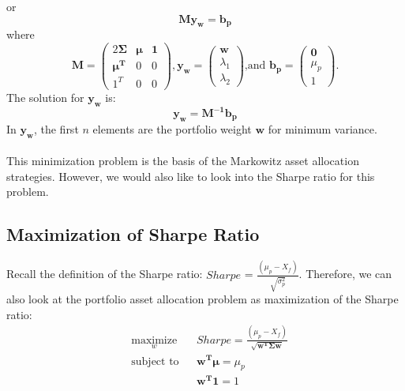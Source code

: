 \documentclass[12pt,titlepage,letter]{article}
\begin{document}
			or 
			$$
				\mathbf{My_w} = \mathbf{b_p}
			$$
			where
			\begin{equation*}
				\mathbf{M} = \begin{pmatrix} 
					2\mathbf{\Sigma} & \pmb{\mu} & \mathbf{1} \\ 
					\mathbf{\mu^T} & 0 & 0 \\ 
					1^T & 0 & 0 
				\end{pmatrix}, 
				\mathbf{y_w}=\begin{pmatrix}
					\mathbf{w} \\ \lambda_1 \\ \lambda_2
				\end{pmatrix} 
				\text{,and }
				\mathbf{b_p} = \begin{pmatrix}
					\mathbf{0} \\ \mu_p \\ 1
				\end{pmatrix}.
			\end{equation*}
			The solution for $\mathbf{y_w}$ is: 
			\begin{equation}
				\mathbf{y_w} = \mathbf{M^{-1}b_p}
			\end{equation}
			In $\mathbf{y_w}$, the first $n$ elements are the portfolio weight $\mathbf{w}$ for minimum variance. \\ \\

			This minimization problem is the basis of the Markowitz asset allocation strategies. However, we would also like to look into the Sharpe ratio for this problem. \\

	\subsection{Maximization of Sharpe Ratio}
		Recall the definition of the Sharpe ratio: $Sharpe$ = $\frac{(\mu_p - X_f)}{\sqrt{\sigma_p^2}}$. Therefore, we can also look at the portfolio asset allocation problem as maximization of the Sharpe ratio: 
		\begin{equation}
			\begin{aligned}
				& \underset{w}{\text{maximize}}
				& & Sharpe = \frac{(\mu_p - X_f)}{\sqrt{\mathbf{w^T\Sigma w}}} \\
				& \text{subject to}
				& & \mathbf{w^T}\pmb{\mu} = \mu_p \\
				&&& \mathbf{w^T1}=1
			\end{aligned}
		\end{equation}
\end{document}
